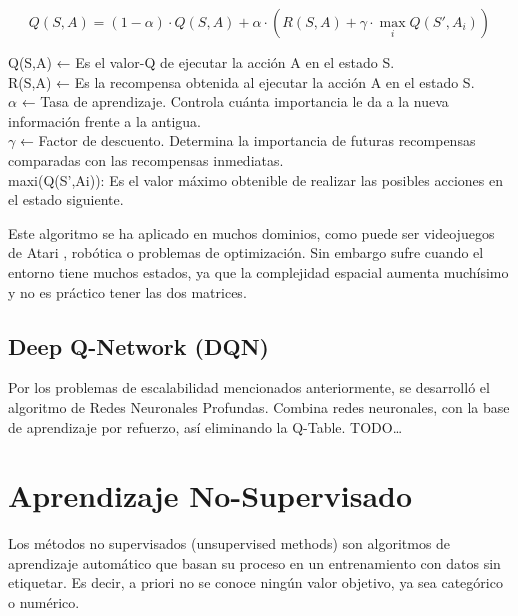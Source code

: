 \begin{flushleft}
	\begin{mdframed}[roundcorner=5pt]
		\[
		Q(S,A) = (1-\alpha) \cdot Q(S,A) + \alpha \cdot \left(R(S,A) + \gamma \cdot \max_{i} Q(S',A_i)\right)
		\]
		\begin{tcolorbox}[boxrule=0.5pt, fontupper=\small]
			\scriptsize
			Q(S,A) ← Es el valor-Q de ejecutar la acción A en el estado S.\\
			R(S,A) ← Es la recompensa obtenida al ejecutar la acción A en el estado S.\\
			$\alpha$ ← Tasa de aprendizaje. Controla cuánta importancia le da a la nueva información frente a la antigua.\\
			$\gamma$ ← Factor de descuento. Determina la importancia de futuras recompensas comparadas con las recompensas inmediatas.\\
			maxi(Q(S’,Ai)): Es el valor máximo obtenible de realizar las posibles acciones en el estado siguiente.
			
				
		\end{tcolorbox}

	
	\end{mdframed}
\end{flushleft}


Este algoritmo se ha aplicado en muchos dominios, como puede ser videojuegos de Atari \cite{mnih2013playing}, robótica o problemas de optimización. Sin embargo sufre cuando el entorno tiene muchos estados, ya que la complejidad espacial aumenta muchísimo y no es práctico tener las dos matrices.\\

\subsection{Deep Q-Network (DQN)}
Por los problemas de escalabilidad mencionados anteriormente, se desarrolló el algoritmo de Redes Neuronales Profundas. Combina redes neuronales, con la base de aprendizaje por refuerzo, así eliminando la Q-Table.
\color{blue} TODO… \color{black}


\section{Aprendizaje No-Supervisado}

Los métodos no supervisados (unsupervised methods) son algoritmos de aprendizaje automático que basan su proceso en un entrenamiento con datos sin etiquetar. Es decir, a priori no se conoce ningún valor objetivo, ya sea categórico o numérico. 

